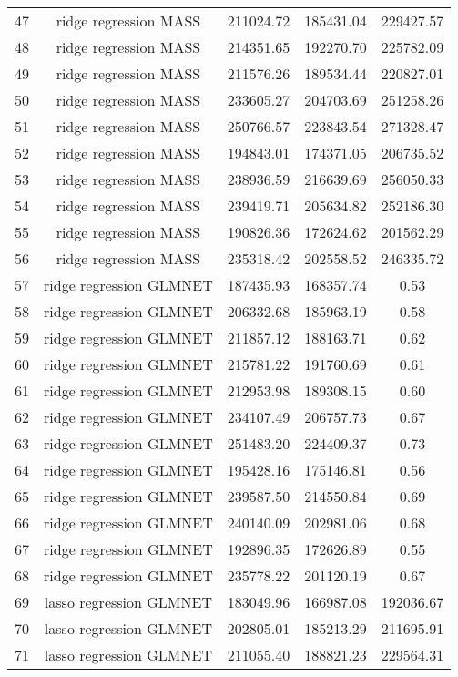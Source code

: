 \begin{tabular}{ccccc}
  47 & ridge regression MASS & 211024.72 & 185431.04 & 229427.57 \\ 
  48 & ridge regression MASS & 214351.65 & 192270.70 & 225782.09 \\ 
  49 & ridge regression MASS & 211576.26 & 189534.44 & 220827.01 \\ 
  50 & ridge regression MASS & 233605.27 & 204703.69 & 251258.26 \\ 
  51 & ridge regression MASS & 250766.57 & 223843.54 & 271328.47 \\ 
  52 & ridge regression MASS & 194843.01 & 174371.05 & 206735.52 \\ 
  53 & ridge regression MASS & 238936.59 & 216639.69 & 256050.33 \\ 
  54 & ridge regression MASS & 239419.71 & 205634.82 & 252186.30 \\ 
  55 & ridge regression MASS & 190826.36 & 172624.62 & 201562.29 \\ 
  56 & ridge regression MASS & 235318.42 & 202558.52 & 246335.72 \\ 
  57 & ridge regression GLMNET & 187435.93 & 168357.74 & 0.53 \\ 
  58 & ridge regression GLMNET & 206332.68 & 185963.19 & 0.58 \\ 
  59 & ridge regression GLMNET & 211857.12 & 188163.71 & 0.62 \\ 
  60 & ridge regression GLMNET & 215781.22 & 191760.69 & 0.61 \\ 
  61 & ridge regression GLMNET & 212953.98 & 189308.15 & 0.60 \\ 
  62 & ridge regression GLMNET & 234107.49 & 206757.73 & 0.67 \\ 
  63 & ridge regression GLMNET & 251483.20 & 224409.37 & 0.73 \\ 
  64 & ridge regression GLMNET & 195428.16 & 175146.81 & 0.56 \\ 
  65 & ridge regression GLMNET & 239587.50 & 214550.84 & 0.69 \\ 
  66 & ridge regression GLMNET & 240140.09 & 202981.06 & 0.68 \\ 
  67 & ridge regression GLMNET & 192896.35 & 172626.89 & 0.55 \\ 
  68 & ridge regression GLMNET & 235778.22 & 201120.19 & 0.67 \\ 
  69 & lasso regression GLMNET & 183049.96 & 166987.08 & 192036.67 \\ 
  70 & lasso regression GLMNET & 202805.01 & 185213.29 & 211695.91 \\ 
  71 & lasso regression GLMNET & 211055.40 & 188821.23 & 229564.31 \\ 

\end{tabular}
